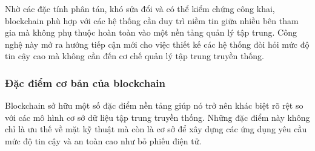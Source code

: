 Nhờ các đặc tính phân tán, khó sửa đổi và có thể kiểm chứng công khai, blockchain phù hợp với các hệ thống cần duy trì niềm tin giữa nhiều bên tham gia mà không phụ thuộc hoàn toàn vào một nền tảng quản lý tập trung. Công nghệ này mở ra hướng tiếp cận mới cho việc thiết kế các hệ thống đòi hỏi mức độ tin cậy cao mà không cần đến cơ chế quản lý tập trung truyền thống.

\subsubsection{Đặc điểm cơ bản của blockchain}

Blockchain sở hữu một số đặc điểm nền tảng giúp nó trở nên khác biệt rõ rệt so với các mô hình cơ sở dữ liệu tập trung truyền thống. Những đặc điểm này không chỉ là ưu thế về mặt kỹ thuật mà còn là cơ sở để xây dựng các ứng dụng yêu cầu mức độ tin cậy và an toàn cao như bỏ phiếu điện tử.

